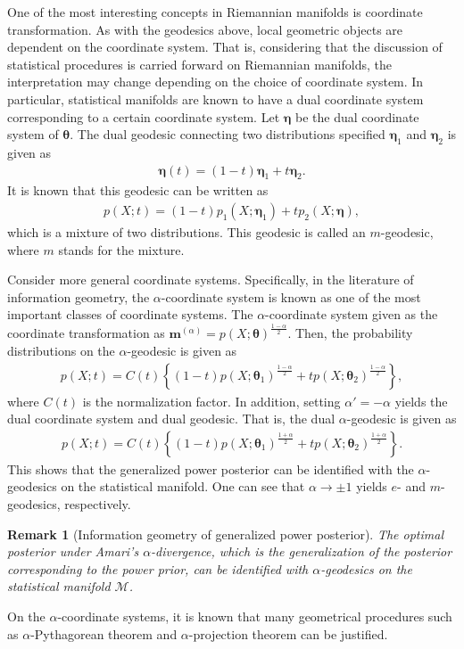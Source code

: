 \documentclass[12pt]{article}
\newtheorem{remark}{Remark}
\begin{document}
One of the most interesting concepts in Riemannian manifolds is coordinate transformation.
As with the geodesics above, local geometric objects are dependent on the coordinate system.
That is, considering that the discussion of statistical procedures is carried forward on Riemannian manifolds, the interpretation may change depending on the choice of coordinate system.
In particular, statistical manifolds are known to have a dual coordinate system corresponding to a certain coordinate system.
Let $\bm{\eta}$ be the dual coordinate system of $\bm{\theta}$.
The dual geodesic connecting two distributions specified $\bm{\eta}_1$ and $\bm{\eta}_2$ is given as
\begin{align*}
    \bm{\eta}(t) = (1 - t) \bm{\eta}_1 + t \bm{\eta}_2.
\end{align*}
It is known that this geodesic can be written as
\begin{align*}
    p(X; t) = (1 - t) p_1(X; \bm{\eta}_1) + t p_2(X; \bm{\eta}),
\end{align*}
which is a mixture of two distributions.
This geodesic is called an $m$-geodesic, where $m$ stands for the mixture.

Consider more general coordinate systems.
Specifically, in the literature of information geometry, the $\alpha$-coordinate system is known as one of the most important classes of coordinate systems.
The $\alpha$-coordinate system given as the coordinate transformation as $\bm{m}^{(\alpha)} = p(X; \bm{\theta})^{\frac{1 - \alpha}{2}}$.
Then, the probability distributions on the $\alpha$-geodesic is given as
\begin{align*}
    p(X; t) = C(t)\left\{(1 - t) p(X; \bm{\theta}_1)^{\frac{1 - \alpha}{2}} + t p(X; \bm{\theta}_2)^{\frac{1 - \alpha}{2}} \right\},
\end{align*}
where $C(t)$ is the normalization factor.
In addition, setting $\alpha' = -\alpha$ yields the dual coordinate system and dual geodesic.
That is, the dual $\alpha$-geodesic is given as
\begin{align*}
    p(X; t) = C(t)\left\{(1 - t) p(X; \bm{\theta}_1)^{\frac{1 + \alpha}{2}} + t p(X; \bm{\theta}_2)^{\frac{1 + \alpha}{2}} \right\}.
\end{align*}
This shows that the generalized power posterior can be identified with the $\alpha$-geodesics on the statistical manifold.
One can see that $\alpha \to \pm 1$ yields $e$- and $m$-geodesics, respectively.
\begin{remark}[Information geometry of generalized power posterior]
    The optimal posterior under Amari's $\alpha$-divergence, which is the generalization of the posterior corresponding to the power prior, can be identified with $\alpha$-geodesics on the statistical manifold $\mathcal{M}$.
\end{remark}
On the $\alpha$-coordinate systems, it is known that many geometrical procedures such as $\alpha$-Pythagorean theorem and $\alpha$-projection theorem can be justified.
\end{document}
